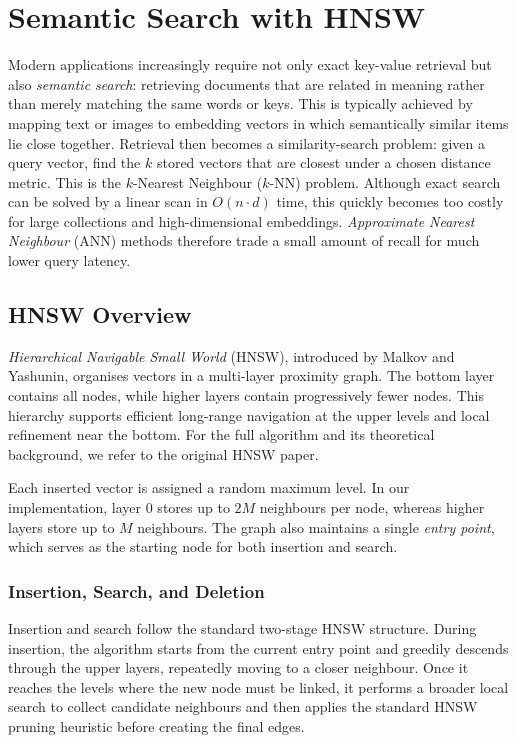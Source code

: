 \section{Semantic Search with HNSW}

Modern applications increasingly require not only exact key-value retrieval but also \textit{semantic search}: retrieving documents that are related in meaning rather than merely matching the same words or keys. This is typically achieved by mapping text or images to embedding vectors in which semantically similar items lie close together. Retrieval then becomes a similarity-search problem: given a query vector, find the $k$ stored vectors that are closest under a chosen distance metric. This is the $k$-Nearest Neighbour ($k$-NN) problem. Although exact search can be solved by a linear scan in $O(n \cdot d)$ time, this quickly becomes too costly for large collections and high-dimensional embeddings. \textit{Approximate Nearest Neighbour} (ANN) methods therefore trade a small amount of recall for much lower query latency.

\subsection{HNSW Overview}
{\textit{Hierarchical Navigable Small World}} (HNSW), introduced by Malkov and Yashunin, organises vectors in a multi-layer proximity graph. The bottom layer contains all nodes, while higher layers contain progressively fewer nodes. This hierarchy supports efficient long-range navigation at the upper levels and local refinement near the bottom. For the full algorithm and its theoretical background, we refer to the original HNSW paper\cite{8594636}.

\medskip
\noindent
Each inserted vector is assigned a random maximum level. In our implementation, layer 0 stores up to $2M$ neighbours per node, whereas higher layers store up to $M$ neighbours. The graph also maintains a single \emph{entry point}, which serves as the starting node for both insertion and search.

\subsubsection{Insertion, Search, and Deletion}
Insertion and search follow the standard two-stage HNSW structure. During insertion, the algorithm starts from the current entry point and greedily descends through the upper layers, repeatedly moving to a closer neighbour. Once it reaches the levels where the new node must be linked, it performs a broader local search to collect candidate neighbours and then applies the standard HNSW pruning heuristic before creating the final edges.

